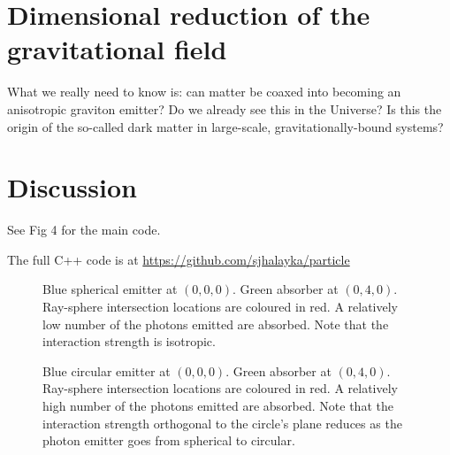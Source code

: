 \documentclass[12pt]{article}
\begin{document}
\section{Dimensional reduction of the gravitational field}

What we really need to know is: can matter be coaxed into becoming an anisotropic graviton emitter?
Do we already see this in the Universe?
Is this the origin of the so-called dark matter in large-scale, gravitationally-bound systems?



\section{Discussion}

See Fig 4 for the main code.

The full C++ code is at \url{https://github.com/sjhalayka/particle}




\pagebreak





\begin{figure} 
\centering
{}
  \caption{
Blue spherical emitter at $(0, 0, 0)$. 
Green absorber at $(0, 4, 0)$. 
Ray-sphere intersection locations are coloured in red.
A relatively low number of the photons emitted are absorbed.
Note that the interaction strength is isotropic.
}
\end{figure}


\begin{figure} 
\centering
{}
  \caption{
Blue circular emitter at $(0, 0, 0)$. 
Green absorber at $(0, 4, 0)$. 
Ray-sphere intersection locations are coloured in red.
A relatively high number of the photons emitted are absorbed.
Note that the interaction strength orthogonal to the circle's plane reduces as the photon emitter goes from spherical to circular.
}
\end{figure}
\end{document}
